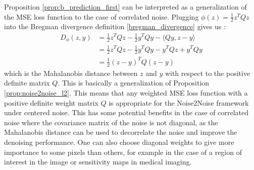 Proposition \ref{prop:b_prediction_first} can be interpreted as a generalization of the MSE loss function to the case of correlated noise.
Plugging $\phi(z) = \frac{1}{2} z^T Q z$ into the Bregman divergence definition \eqref{bregman_divergence} gives us :
\begin{align}
    D_\phi(z, y) &= \frac{1}{2} z^T Q z - \frac{1}{2} y^T Q y - \langle Q y, z - y \rangle \\
    &= \frac{1}{2} z^T Q z - \frac{1}{2} y^T Q y - y^T Q z + y^T Q y \\
    &= \frac{1}{2} (z - y)^T Q (z - y)
\end{align}
\noindent which is the Mahalanobis distance between $z$ and $y$ with respect to the positive definite matrix $Q$.
This is basically a generalization of Proposition \ref{prop:noise2noise_l2}.
This means that any weighted MSE loss function with a positive definite weight matrix $Q$ is appropriate for the Noise2Noise framework under centered noise.
This has some potential benefits in the case of correlated noise where the covariance matrix of the noise is not diagonal, as the Mahalanobis distance can be used to decorrelate the noise and improve the denoising performance.
One can also choose diagonal weights to give more importance to some pixels than others, for example in the case of a region of interest in the image or sensitivity maps in medical imaging.











